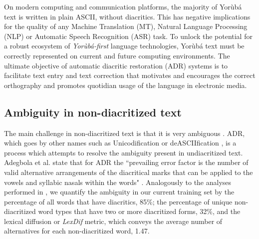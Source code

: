 \documentclass{article} %
\begin{document}
On modern computing and communication platforms, the majority of Yor{\`u}b{\'a} text is written in plain ASCII, without diacritics. This has negative implications for the quality of any Machine Translation (MT), Natural Language Processing (NLP) or Automatic Speech Recognition (ASR) task. To unlock the potential for a robust ecosystem of \emph{Yor{\`u}b{\'a}-first} language technologies, Yor{\`u}b{\'a} text must be correctly represented on current and future computing environments. The ultimate objective of automatic diacritic restoration (ADR) systems is to facilitate text entry and text correction that motivates and encourages the correct orthography and promotes quotidian usage of the language in electronic media.

\subsection{Ambiguity in non-diacritized text}
The main challenge in non-diacritized text is that it is very ambiguous \citep{orife2018adr, adegbola2012quantifying, asahiah2017restoring, de2007automatic}. ADR, which goes by other names such as Unicodification \citep{scannell2011statistical} or deASCIIfication \citep{arslan2016deasciification}, is a process which attempts to resolve the ambiguity present in undiacritized text. Adegbola et al. state that for ADR the ``prevailing error factor is the number of valid alternative arrangements of the diacritical marks that can be applied to the vowels and syllabic nasals within the words" \citep{adegbola2012quantifying}. Analogously to the analyses performed in \citep{orife2018adr}, we quantify the ambiguity in our current training set by the percentage of all words that have diacritics, 85\%; the percentage of unique non-diacritized word types that have two or more diacritized forms, 32\%, and the lexical diffusion or \emph{LexDif} metric, which conveys the average number of alternatives for each non-diacritized word, 1.47.
\end{document}
